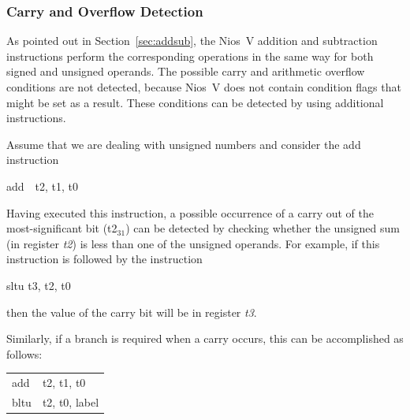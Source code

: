 \documentclass[11pt, twoside, pdftex]{article}
\begin{document}
\newpage
\subsubsection{Carry and Overflow Detection}
\label{sec:overflow}

As pointed out in Section~\ref{sec:addsub}, the Nios~V addition and subtraction instructions 
perform the corresponding operations
in the same way for both signed and unsigned operands. The possible carry and arithmetic overflow
conditions are not detected, because Nios~V does not contain condition flags that might be set as
a result. These conditions can be detected by using additional instructions.

Assume that we are dealing with unsigned numbers and consider the {\sf add} instruction
\vspace{-\baselineskip}
\begin{center}
{\sf add~~t2, t1, t0}
\end{center}

Having executed this instruction, a possible occurrence of a carry out of the most-significant
bit (t2$_{31}$) can be detected by checking whether the unsigned sum (in register {\it t2}) 
is less than one of the unsigned operands. For example, if this instruction is followed by 
the instruction
\vspace{-\baselineskip}
\begin{center}
{\sf sltu} {\sf t3, t2, t0}
\end{center}

then the value of the carry bit will be in register {\it t3}.

\noindent
Similarly, if a branch is required when a carry occurs, this can be accomplished as follows:
\vspace{-\baselineskip}
\begin{center}
\begin{tabular}{ll}
{\sf add} & {\sf t2, t1, t0} \\
{\sf bltu} & {\sf t2, t0, label}
\end{tabular}
\end{center}
\end{document}
